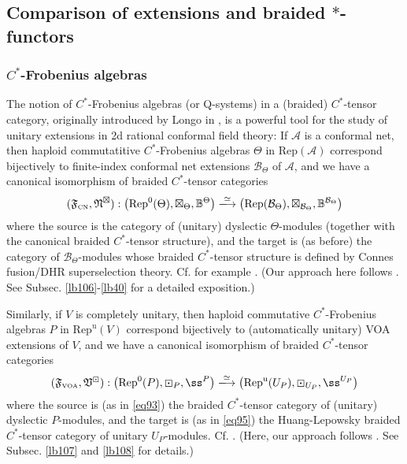 \documentclass[11pt,b5paper,notitlepage]{article}
\theoremstyle{definition}
\theoremstyle{plain}
\newcommand{\fk}{\mathfrak}
\newcommand{\mc}{\mathcal}
\newcommand{\Rep}{\mathrm{Rep}}
\newcommand{\uni}{\mathrm{u}}
\newcommand{\RepV}{{\mathrm{Rep}^\uni(V)}}
\newcommand{\VOA}{{\scriptscriptstyle \mathrm{VOA}}}
\newcommand{\CN}{{\scriptscriptstyle \mathrm{CN}}}
\newcommand{\RepUP}{\mathrm{Rep}^{\mathrm u}(U_P)}
\numberwithin{equation}{section}
\begin{document}
\subsection{Comparison of extensions and braided $*$-functors}


\subsubsection{$C^*$-Frobenius algebras}

The notion of $C^*$-Frobenius algebras (or Q-systems) in a (braided) $C^*$-tensor category, originally introduced by Longo in \cite{Lon94}, is a powerful tool for the study of unitary extensions in 2d rational conformal field theory: If $\mc A$ is a conformal net, then haploid commutatitive $C^*$-Frobenius algebras $\Theta$ in $\Rep(\mc A)$ correspond bijectively to finite-index conformal net extensions $\mc B_\Theta$ of $\mc A$, and we have a canonical isomorphism of braided $C^*$-tensor categories
\begin{align}\label{eq93}
(\fk F_\CN,\fk N^\boxtimes):\big(\Rep^0(\Theta),\boxtimes_\Theta,\mathbb B^\Theta\big)\xlongrightarrow{\simeq}\big(\Rep(\mc B_\Theta),\boxtimes_{\mc B_\Theta},\mathbb B^{\mc B_\Theta}\big)
\end{align}
where the source is the category of (unitary) dyslectic $\Theta$-modules (together with the canonical braided $C^*$-tensor structure), and the target is (as before) the category of $\mc B_\Theta$-modules whose braided $C^*$-tensor structure is defined by Connes fusion/DHR superselection theory. Cf. for example \cite{LR95,EP03,BKL15,BKLR15,Gui21c}. (Our approach here follows \cite{Gui21c}. See Subsec. \ref{lb106}-\ref{lb40} for a detailed exposition.)

Similarly, if $V$ is completely unitary, then haploid commutative $C^*$-Frobenius algebras $P$ in $\RepV$ correspond bijectively to (automatically unitary) VOA extensions of $V$, and we have a canonical isomorphism of braided $C^*$-tensor categories
\begin{align}\label{eq94}
(\fk F_\VOA,\fk V^\boxdot):\big(\Rep^0(P),\boxdot_P,\ss^P\big)\xlongrightarrow{\simeq}\big(\RepUP,\boxdot_{U_P},\ss^{U_P} \big)
\end{align}
where the source is (as in \eqref{eq93}) the braided $C^*$-tensor category of (unitary) dyslectic $P$-modules, and the target is (as in \eqref{eq95}) the Huang-Lepowsky braided $C^*$-tensor category of unitary $U_P$-modules. Cf. \cite{KO02,HKL15,CKM24,Gui22,CGGH23}. (Here, our approach follows \cite{Gui22}. See Subsec. \ref{lb107} and \ref{lb108} for details.)
\end{document}
